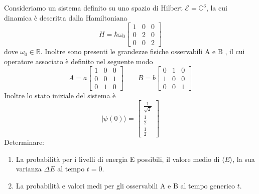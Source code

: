 Consideriamo un sistema definito su uno spazio di Hilbert $\mathcal{E} = \mathbb{C}^3$, la cui dinamica \`e descritta dalla Hamiltoniana
\begin{equation*}
	H = \hbar \omega_0\left [ \begin{array}{ccc}
		1 & 0 & 0\\
		0 & 2 & 0 \\
		0 & 0 & 2
	\end{array}\right]
\end{equation*} 
dove $\omega_0 \in \mathbb{R}$. Inoltre sono presenti le grandezze fisiche osservabili A e  B , il cui operatore associato \`e definito nel seguente modo
\begin{equation*}
A = a\left [ \begin{array}{ccc}
		1 & 0 & 0\\
		0 & 0 & 1 \\
		0 & 1 & 0
	\end{array}\right] 
	\quad \quad B = b\left [ \begin{array}{ccc}
		0 & 1 & 0\\
		1 & 0 & 0 \\
		0 & 0 & 1
	\end{array}\right] 
\end{equation*}
Inoltre lo stato iniziale del sistema \`e 
\begin{equation*}
	|\psi(0) \rangle = \left[ \begin{array}{c}
		\frac{1}{\sqrt{2}} \\ \frac{1}{2} \\ \frac{1}{2}
	\end{array}\right ]
\end{equation*}
Determinare:
\begin{enumerate}
	\item La probabilit\`a per i livelli di energia E possibili, il valore medio di $\langle E \rangle $, la sua varianza $\Delta E$ al tempo $t=0$.
	\item La probabilit\`a e valori medi per gli osservabili A e B al tempo generico $t$.
\end{enumerate}

